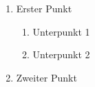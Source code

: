 
\begin{enumerate}
    \item Erster Punkt
      \begin{enumerate}
        \item Unterpunkt 1
        \item Unterpunkt 2
      \end{enumerate}
    \item Zweiter Punkt
\end{enumerate}
\newpage